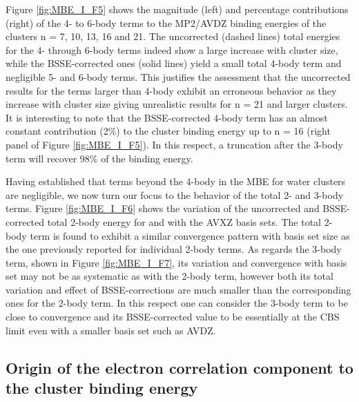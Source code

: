\documentclass[11pt, proquest]{uwthesis}[2020/02/24]
\let\ce\ch
\newcommand{\textapprox}{\raisebox{0.5ex}{\texttildelow}}
\begin{document}
\par Figure \ref{fig:MBE_I_F5} shows the magnitude (left) and percentage contributions (right) of the 4- to 6-body terms to the MP2/AVDZ binding energies of the clusters n = 7, 10, 13, 16 and 21. The uncorrected (dashed lines) total energies for the 4- through 6-body terms indeed show a large increase with cluster size, while the BSSE-corrected ones (solid lines) yield a small total 4-body term and negligible 5- and 6-body terms. This justifies the assessment that the uncorrected results for the terms larger than 4-body exhibit an erroneous behavior as they increase with cluster size giving unrealistic results for n = 21 and larger clusters. It is interesting to note that the BSSE-corrected 4-body term has an almost constant contribution (\textapprox2\%) to the cluster binding energy up to n = 16 (right panel of Figure \ref{fig:MBE_I_F5}). In this respect, a truncation after the 3-body term will recover \textapprox98\% of the binding energy.

\par Having established that terms beyond the 4-body in the MBE for water clusters are negligible, we now turn our focus to the behavior of the total 2- and 3-body terms. Figure \ref{fig:MBE_I_F6} shows the variation of the uncorrected and BSSE-corrected total 2-body energy for \ce{(H2O)7} and \ce{(H2O)_{10}} with the AVXZ basis sets. The total 2-body term is found to exhibit a similar convergence pattern with basis set size as the one previously reported for individual 2-body terms.\autocite{xantheas_ab_1994,dunning_road_2000,miliordos_n_2015,miliordos_benchmark_2014} As regards the 3-body term, shown in Figure \ref{fig:MBE_I_F7}, its variation and convergence with basis set may not be as systematic as with the 2-body term, however both its total variation and effect of BSSE-corrections are much smaller than the corresponding ones for the 2-body term. In this respect one can consider the 3-body term to be close to convergence and its BSSE-corrected value to be essentially at the CBS limit even with a smaller basis set such as AVDZ.



\subsection{Origin of the electron correlation component to the cluster binding energy}
\end{document}
